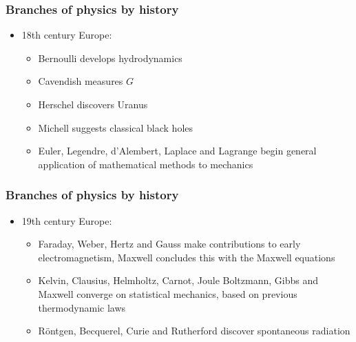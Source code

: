\documentclass{beamer}
\begin{document}
\begin{frame}
\frametitle{Branches of physics by history}
\begin{itemize}
  \item<1-> 18th century Europe:
    \begin{itemize}
      \item<2-> Bernoulli develops hydrodynamics
      \item<3-> Cavendish measures $G$
      \item<4-> Herschel discovers Uranus
      \item<5-> Michell suggests classical black holes
      \item<6-> Euler, Legendre, d'Alembert, Laplace and Lagrange begin general application of mathematical methods to mechanics
    \end{itemize}
\end{itemize}
\end{frame}

\begin{frame}
\frametitle{Branches of physics by history}
\begin{itemize}
  \item<1-> 19th century Europe:
    \begin{itemize}
      \item<2-> Faraday, Weber, Hertz and Gauss make contributions to early electromagnetism, Maxwell concludes this with the Maxwell equations
      \item<3-> Kelvin, Clausius, Helmholtz, Carnot, Joule Boltzmann, Gibbs and Maxwell converge on statistical mechanics, based on previous thermodynamic laws
      \item<4-> R\"ontgen, Becquerel, Curie and Rutherford discover spontaneous radiation
    \end{itemize}
\end{itemize}
\end{frame}
\end{document}
